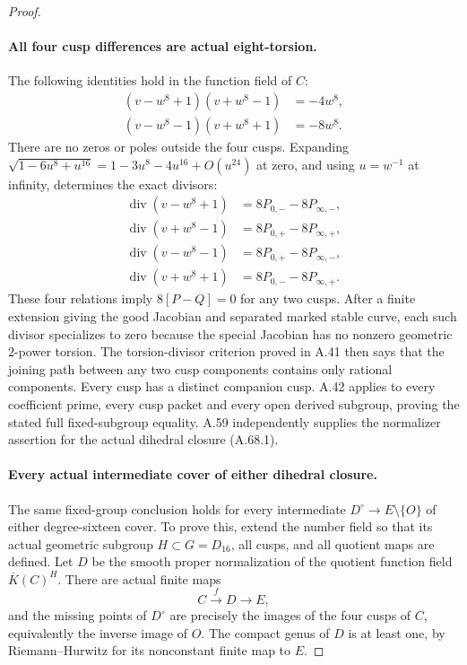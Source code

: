 \begin{proof}
\paragraph{All four cusp differences are actual eight-torsion.}
The following identities hold in the function field of \(C\):
\[
 \begin{split}
 (v-w^8+1)(v+w^8-1)&=-4w^8,\\
 (v-w^8-1)(v+w^8+1)&=-8w^8.
 \end{split}                                                   \tag{A.68.11}
\]
There are no zeros or poles outside the four cusps. Expanding
\(\sqrt{1-6u^8+u^{16}}=1-3u^8-4u^{16}+O(u^{24})\) at zero,
and using \(u=w^{-1}\) at infinity, determines the exact divisors:
\[
 \begin{split}
 \operatorname{div}(v-w^8+1)&=8P_{0,-}-8P_{\infty,-},\\
 \operatorname{div}(v+w^8-1)&=8P_{0,+}-8P_{\infty,+},\\
 \operatorname{div}(v-w^8-1)&=8P_{0,+}-8P_{\infty,-},\\
 \operatorname{div}(v+w^8+1)&=8P_{0,-}-8P_{\infty,+}.
 \end{split}                                                   \tag{A.68.12}
\]
These four relations imply \(8[P-Q]=0\) for any two cusps.
After a finite extension giving the good Jacobian and separated
marked stable curve, each such divisor specializes to zero because
the special Jacobian has no nonzero geometric \(2\)-power torsion.
The torsion-divisor criterion proved in A.41 then says that the
joining path between any two cusp components contains only rational
components. Every cusp has a distinct companion cusp. A.42 applies
to every coefficient prime, every cusp packet and every open derived
subgroup, proving the stated full fixed-subgroup equality. A.59
independently supplies the normalizer assertion for the actual
dihedral closure (A.68.1).

\paragraph{Every actual intermediate cover of either dihedral closure.}
The same fixed-group conclusion holds for every intermediate
\(D^\circ\to E\setminus\{O\}\) of either degree-sixteen cover.
To prove this, extend the number field so that its actual geometric
subgroup \(H\subset G=D_{16}\), all cusps, and all quotient maps are
defined. Let \(D\) be the smooth proper normalization of the quotient
function field \(\overline K(C)^H\). There are actual finite maps
\[
                   C\xrightarrow{f}D\longrightarrow E,
\]
and the missing points of \(D^\circ\) are precisely the images of
the four cusps of \(C\), equivalently the inverse image of \(O\).
The compact genus of \(D\) is at least one, by Riemann--Hurwitz
for its nonconstant finite map to \(E\).


\end{proof}
